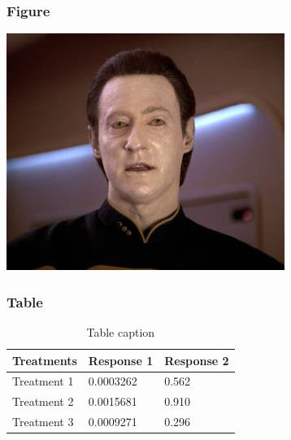 \documentclass[12pt]{beamer}\usepackage[]{graphicx}\usepackage[]{color}
\begin{document}
\begin{frame}
\frametitle{Figure}
   \includegraphics[width=1.0\linewidth]{DataTNG.jpg}
\end{frame}

\begin{frame}
\frametitle{Table}
\begin{table}
\begin{tabular}{l l l}
\toprule
\textbf{Treatments} & \textbf{Response 1} & \textbf{Response 2}\\
\midrule
Treatment 1 & 0.0003262 & 0.562 \\
Treatment 2 & 0.0015681 & 0.910 \\
Treatment 3 & 0.0009271 & 0.296 \\
\bottomrule
\end{tabular}
\caption{Table caption}
\end{table}
\end{frame}

\end{document}

